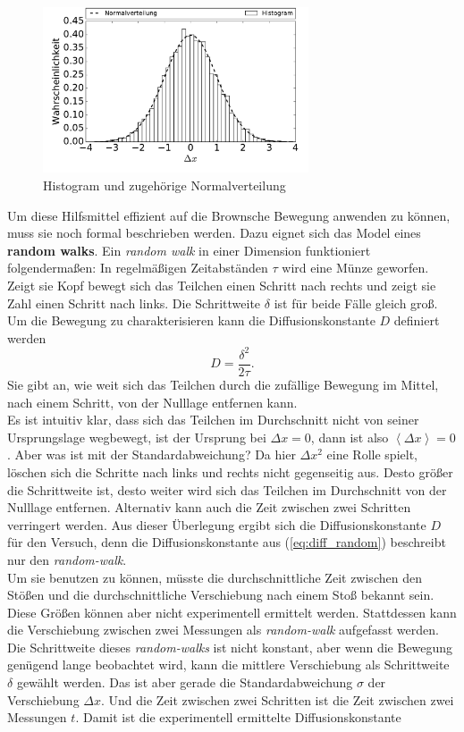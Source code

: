 \documentclass[a4paper, 12pt]{scrartcl}
\newcommand{\mean}[1]{\left< #1 \right>}
\begin{document}
\begin{figure}[h!]
  \centering
  \includegraphics[width=0.7\textwidth]{figures/histogram}
  \caption{Histogram und zugehörige Normalverteilung}\label{fig:histo}
\end{figure}
Um diese Hilfsmittel effizient auf die Brownsche Bewegung anwenden zu können, muss sie noch formal beschrieben werden. Dazu eignet sich das Model eines \textbf{random walks}. Ein \emph{random walk} in einer Dimension funktioniert folgendermaßen: In regelmäßigen Zeitabständen $\tau$ wird eine Münze geworfen. Zeigt sie Kopf bewegt sich das Teilchen einen Schritt nach rechts und zeigt sie Zahl einen Schritt nach links. Die Schrittweite $\delta$ ist für beide Fälle gleich groß. Um die Bewegung zu charakterisieren kann die Diffusionskonstante $D$ definiert werden
\begin{equation}
  D = \frac{\delta^2}{2 \tau}. \label{eq:diff_random}
\end{equation}
Sie gibt an, wie weit sich das Teilchen durch die zufällige Bewegung im Mittel, nach einem Schritt, von der Nulllage entfernen kann.\\
Es ist intuitiv klar, dass sich das Teilchen im Durchschnitt nicht von seiner Ursprungslage wegbewegt, ist der Ursprung bei $\Delta x = 0$, dann ist also $\mean{\Delta x} = 0$. Aber was ist mit der Standardabweichung? Da hier $\Delta x^2$ eine Rolle spielt, löschen sich die Schritte nach links und rechts nicht gegenseitig aus.
Desto größer die Schrittweite ist, desto weiter wird sich das Teilchen im Durchschnitt von der Nulllage entfernen. Alternativ kann auch die Zeit zwischen zwei Schritten verringert werden. Aus dieser Überlegung ergibt sich die Diffusionskonstante $D$ für den Versuch, denn die Diffusionskonstante aus (\ref{eq:diff_random}) beschreibt nur den \emph{random-walk}.\\
Um sie benutzen zu können, müsste die durchschnittliche Zeit zwischen den Stößen und die durchschnittliche Verschiebung nach einem Stoß bekannt sein. Diese Größen können aber nicht experimentell ermittelt werden. Stattdessen kann die Verschiebung zwischen zwei Messungen als \emph{random-walk} aufgefasst werden. Die Schrittweite dieses \emph{random-walks} ist nicht konstant, aber wenn die Bewegung genügend lange beobachtet wird, kann die mittlere Verschiebung als Schrittweite $\delta$ gewählt werden. Das ist aber gerade die Standardabweichung $\sigma$ der Verschiebung $\Delta x$. Und die Zeit zwischen zwei Schritten ist die Zeit zwischen zwei Messungen $t$. Damit ist die experimentell ermittelte Diffusionskonstante
\end{document}
